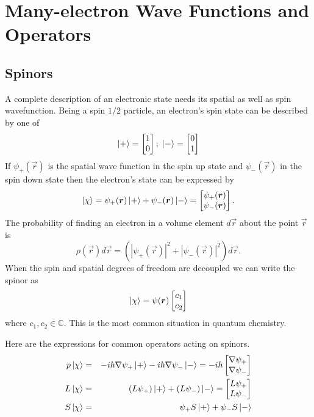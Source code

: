 \chapter{Many-electron Wave Functions and Operators}\label{c2}
\section{Spinors}\label{c2s1}
A complete description of an electronic state needs its spatial as well as spin
wavefunction. Being a spin $1/2$ particle, an electron's spin state can be 
described by one of
\begin{equation}\label{c2e1}
\ket{+} = \begin{bmatrix} 1 \\ 0 \end{bmatrix}; \;
\ket{-} = \begin{bmatrix} 0 \\ 1 \end{bmatrix}
\end{equation}
If $\psi_+(\vec{r})$ is the spatial wave function in the spin up state and 
$\psi_-(\vec{r})$ in the spin down state then the electron's state can be
expressed by 
\begin{equation}\label{c2e2}
\ket{\chi} = \psi_+(\bm{r})\ket{+} + \psi_-(\bm{r})\ket{-} =
\begin{bmatrix}\psi_+(\bm{r}) \\ \psi_-(\bm{r}) \end{bmatrix}.
\end{equation}
The probability of finding an electron in a volume element $d\vec{r}$ about the
point $\vec{r}$ is 
\[
\rho(\vec{r})d\vec{r} = (|\psi_+(\vec{r})|^2 + |\psi_-(\vec{r})|^2)d\vec{r}.
\]
When the spin and spatial degrees of freedom are decoupled we can write the 
spinor as
\begin{equation}\label{c2e3}
\ket{\chi} = \psi(\bm{r})\begin{bmatrix}c_1 \\ c_2\end{bmatrix}
\end{equation}
where $c_1, c_2 \in \mathbb{C}$. This is the most common situation in quantum
chemistry. 

Here are the expressions for common operators acting on spinors.
\begin{eqnarray}
p\ket{\chi} &=& -i\hbar\nabla\psi_+\ket{+} - i\hbar\nabla\psi_-\ket{-} = 
-i\hbar\begin{bmatrix}\nabla\psi_+ \\ \nabla\psi_-\end{bmatrix}
\label{c2e4} \\
L\ket{\chi} &=& (L\psi_+)\ket{+} + (L\psi_-)\ket{-} = 
\begin{bmatrix}L \psi_+ \\ L \psi_-\end{bmatrix}
\label{c2e5} \\
S\ket{\chi} &=& \psi_+S\ket{+} + \psi_-S\ket{-}
\label{c2e6}
\end{eqnarray}

